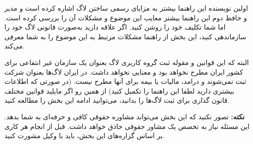 
اولین نویسنده این راهنما بیشتر به مزایای رسمی ساختن لاگ اشاره کرده است
و مدیر و حافظ دوم این راهنما بیشتر معایب این موضوع و مشکلات آن را
بررسی کرده است. اما شما تکلیف خود را روشن کنید. اگر علاقه دارید به‌صورت
قانونی لاگ خود را سازماندهی کنید، این بخش از راهنما مشکلات مرتبط به
این موضوع را به شما معرفی می‌کند.

البته که این قوانین و مقوله ثبت گروه کاربری لاگ بعنوان یک سازمان غیر انتفاعی
برای کشور ایران مطرح نخواهد بود و معنایی نخواهد داشت. در ایران لاگ‌ها بعنوان شرکت
ثبت نمی‌شوند و درامد، مالیات یا بیمه برای آنها مطرح نیست.
(در صورتی که اطلاعات بیشتری دارید لطفا این راهنما را تکمیل کنید)
از همین رو اگر مایلید قوانین مختلف قانون گذاری برای ثبت لاگ‌ها را بدانید، می‌توانید
ادامه این بخش را مطالعه کنید.

{\bfseries نکته:}
تصور نکنید که این بخش می‌تواند مشاوره حقوقی کافی و حرفه‌ای به شما بدهد.
این مسئله نیاز به تخصص یک مشاور حقوقی حاذق خواهد داشت. قبل از انجام هر کاری
بر اساس گزاره‌های این بخش، باید با وکیل مشورت کنید.

